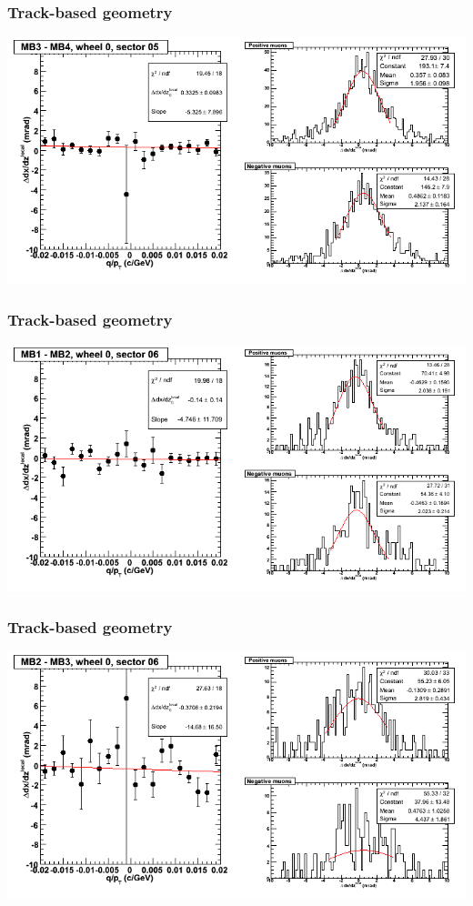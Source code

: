 \documentclass[compress]{beamer}
\begin{document}
\begin{frame}
\frametitle{Track-based geometry}
\includegraphics[width=\linewidth]{NOV4_segdiffs/dt13_slope_C_05_34.png}
\end{frame}

\begin{frame}
\frametitle{Track-based geometry}
\includegraphics[width=\linewidth]{NOV4_segdiffs/dt13_slope_C_06_12.png}
\end{frame}

\begin{frame}
\frametitle{Track-based geometry}
\includegraphics[width=\linewidth]{NOV4_segdiffs/dt13_slope_C_06_23.png}
\end{frame}
\end{document}
